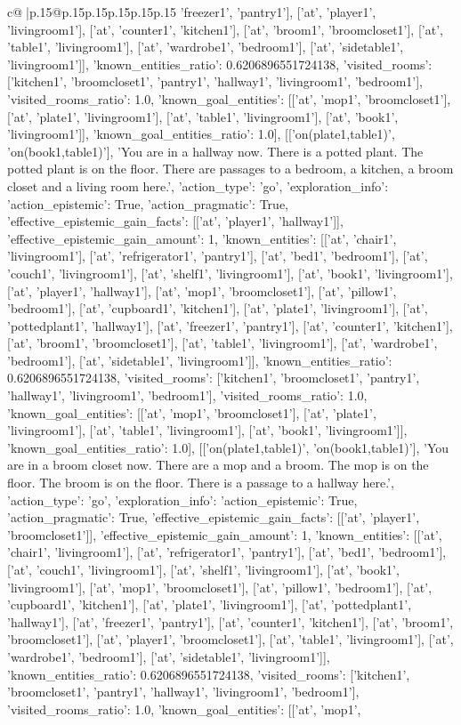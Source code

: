 \documentclass{article}
\begin{document}
{\begin{supertabular}{c@{$\;$}|p{.15\linewidth}@{}p{.15\linewidth}p{.15\linewidth}p{.15\linewidth}p{.15\linewidth}p{.15\linewidth}}
{{{'freezer1', 'pantry1'], ['at', 'player1', 'livingroom1'], ['at', 'counter1', 'kitchen1'], ['at', 'broom1', 'broomcloset1'], ['at', 'table1', 'livingroom1'], ['at', 'wardrobe1', 'bedroom1'], ['at', 'sidetable1', 'livingroom1']], 'known_entities_ratio': 0.6206896551724138, 'visited_rooms': ['kitchen1', 'broomcloset1', 'pantry1', 'hallway1', 'livingroom1', 'bedroom1'], 'visited_rooms_ratio': 1.0, 'known_goal_entities': [['at', 'mop1', 'broomcloset1'], ['at', 'plate1', 'livingroom1'], ['at', 'table1', 'livingroom1'], ['at', 'book1', 'livingroom1']], 'known_goal_entities_ratio': 1.0}}], [['on(plate1,table1)', 'on(book1,table1)'], 'You are in a hallway now. There is a potted plant. The potted plant is on the floor. There are passages to a bedroom, a kitchen, a broom closet and a living room here.', {'action_type': 'go', 'exploration_info': {'action_epistemic': True, 'action_pragmatic': True, 'effective_epistemic_gain_facts': [['at', 'player1', 'hallway1']], 'effective_epistemic_gain_amount': 1, 'known_entities': [['at', 'chair1', 'livingroom1'], ['at', 'refrigerator1', 'pantry1'], ['at', 'bed1', 'bedroom1'], ['at', 'couch1', 'livingroom1'], ['at', 'shelf1', 'livingroom1'], ['at', 'book1', 'livingroom1'], ['at', 'player1', 'hallway1'], ['at', 'mop1', 'broomcloset1'], ['at', 'pillow1', 'bedroom1'], ['at', 'cupboard1', 'kitchen1'], ['at', 'plate1', 'livingroom1'], ['at', 'pottedplant1', 'hallway1'], ['at', 'freezer1', 'pantry1'], ['at', 'counter1', 'kitchen1'], ['at', 'broom1', 'broomcloset1'], ['at', 'table1', 'livingroom1'], ['at', 'wardrobe1', 'bedroom1'], ['at', 'sidetable1', 'livingroom1']], 'known_entities_ratio': 0.6206896551724138, 'visited_rooms': ['kitchen1', 'broomcloset1', 'pantry1', 'hallway1', 'livingroom1', 'bedroom1'], 'visited_rooms_ratio': 1.0, 'known_goal_entities': [['at', 'mop1', 'broomcloset1'], ['at', 'plate1', 'livingroom1'], ['at', 'table1', 'livingroom1'], ['at', 'book1', 'livingroom1']], 'known_goal_entities_ratio': 1.0}}], [['on(plate1,table1)', 'on(book1,table1)'], 'You are in a broom closet now. There are a mop and a broom. The mop is on the floor. The broom is on the floor. There is a passage to a hallway here.', {'action_type': 'go', 'exploration_info': {'action_epistemic': True, 'action_pragmatic': True, 'effective_epistemic_gain_facts': [['at', 'player1', 'broomcloset1']], 'effective_epistemic_gain_amount': 1, 'known_entities': [['at', 'chair1', 'livingroom1'], ['at', 'refrigerator1', 'pantry1'], ['at', 'bed1', 'bedroom1'], ['at', 'couch1', 'livingroom1'], ['at', 'shelf1', 'livingroom1'], ['at', 'book1', 'livingroom1'], ['at', 'mop1', 'broomcloset1'], ['at', 'pillow1', 'bedroom1'], ['at', 'cupboard1', 'kitchen1'], ['at', 'plate1', 'livingroom1'], ['at', 'pottedplant1', 'hallway1'], ['at', 'freezer1', 'pantry1'], ['at', 'counter1', 'kitchen1'], ['at', 'broom1', 'broomcloset1'], ['at', 'player1', 'broomcloset1'], ['at', 'table1', 'livingroom1'], ['at', 'wardrobe1', 'bedroom1'], ['at', 'sidetable1', 'livingroom1']], 'known_entities_ratio': 0.6206896551724138, 'visited_rooms': ['kitchen1', 'broomcloset1', 'pantry1', 'hallway1', 'livingroom1', 'bedroom1'], 'visited_rooms_ratio': 1.0, 'known_goal_entities': [['at', 'mop1', }}}
\end{supertabular}}
\end{document}
